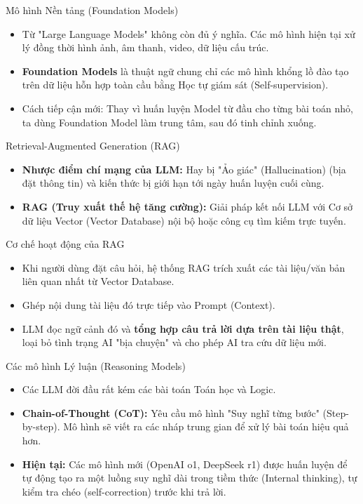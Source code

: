 \documentclass[aspectratio=169]{beamer}
\begin{document}
\begin{frame}{Mô hình Nền tảng (Foundation Models)}
    \begin{itemize}
        \item Từ "Large Language Models" không còn đủ ý nghĩa. Các mô hình hiện tại xử lý đồng thời hình ảnh, âm thanh, video, dữ liệu cấu trúc.
        \item \textbf{Foundation Models} là thuật ngữ chung chỉ các mô hình khổng lồ đào tạo trên dữ liệu hỗn hợp toàn cầu bằng Học tự giám sát (Self-supervision).
        \item Cách tiếp cận mới: Thay vì huấn luyện Model từ đầu cho từng bài toán nhỏ, ta dùng Foundation Model làm trung tâm, sau đó tinh chỉnh xuống.
    \end{itemize}
\end{frame}

\begin{frame}{Retrieval-Augmented Generation (RAG)}
    \begin{itemize}
        \item \textbf{Nhược điểm chí mạng của LLM:} Hay bị "Ảo giác" (Hallucination) (bịa đặt thông tin) và kiến thức bị giới hạn tới ngày huấn luyện cuối cùng.
        \item \textbf{RAG (Truy xuất thế hệ tăng cường):} Giải pháp kết nối LLM với Cơ sở dữ liệu Vector (Vector Database) nội bộ hoặc công cụ tìm kiếm trực tuyến.
    \end{itemize}
\end{frame}

\begin{frame}{Cơ chế hoạt động của RAG}
    \begin{itemize}
        \item Khi người dùng đặt câu hỏi, hệ thống RAG trích xuất các tài liệu/văn bản liên quan nhất từ Vector Database.
        \item Ghép nội dung tài liệu đó trực tiếp vào Prompt (Context).
        \item LLM đọc ngữ cảnh đó và \textbf{tổng hợp câu trả lời dựa trên tài liệu thật}, loại bỏ tình trạng AI "bịa chuyện" và cho phép AI tra cứu dữ liệu mới.
    \end{itemize}
\end{frame}

\begin{frame}{Các mô hình Lý luận (Reasoning Models)}
    \begin{itemize}
        \item Các LLM đời đầu rất kém các bài toán Toán học và Logic.
        \item \textbf{Chain-of-Thought (CoT):} Yêu cầu mô hình "Suy nghĩ từng bước" (Step-by-step). Mô hình sẽ viết ra các nháp trung gian để xử lý bài toán hiệu quả hơn.
        \item \textbf{Hiện tại:} Các mô hình mới (OpenAI o1, DeepSeek r1) được huấn luyện để tự động tạo ra một luồng suy nghĩ dài trong tiềm thức (Internal thinking), tự kiểm tra chéo (self-correction) trước khi trả lời.
    \end{itemize}
\end{frame}
\end{document}
